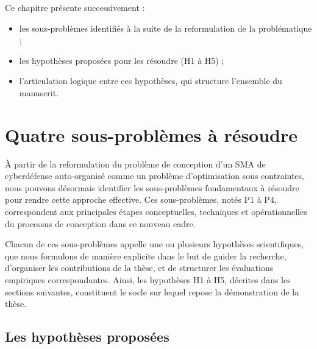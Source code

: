 \documentclass[ twoside,openright,titlepage,numbers=noenddot,headinclude,%
                footinclude=true,cleardoublepage=empty,abstractoff, %
                BCOR=5mm,paper=a4,fontsize=11pt,%
                french,american,%
                ]{scrreprt}
\begin{document}
Ce chapitre présente successivement :
\begin{itemize}
    \item les sous-problèmes identifiés à la suite de la reformulation de la problématique ;
    \item les hypothèses proposées pour les résoudre (H1 à H5) ;
    \item l'articulation logique entre ces hypothèses, qui structure l'ensemble du manuscrit.
\end{itemize}

\section{Quatre sous-problèmes à résoudre}\label{sec:hypotheses-these}


À partir de la reformulation du problème de conception d'un SMA de cyberdéfense auto-organisé comme un problème d'optimisation sous contraintes, nous pouvons désormais identifier les sous-problèmes fondamentaux à résoudre pour rendre cette approche effective. Ces sous-problèmes, notés P1 à P4, correspondent aux principales étapes conceptuelles, techniques et opérationnelles du processus de conception dans ce nouveau cadre.

Chacun de ces sous-problèmes appelle une ou plusieurs hypothèses scientifiques, que nous formulons de manière explicite dans le but de guider la recherche, d'organiser les contributions de la thèse, et de structurer les évaluations empiriques correspondantes. Ainsi, les hypothèses H1 à H5, décrites dans les sections suivantes, constituent le socle sur lequel repose la démonstration de la thèse.


\subsection{Les hypothèses proposées}
\end{document}
